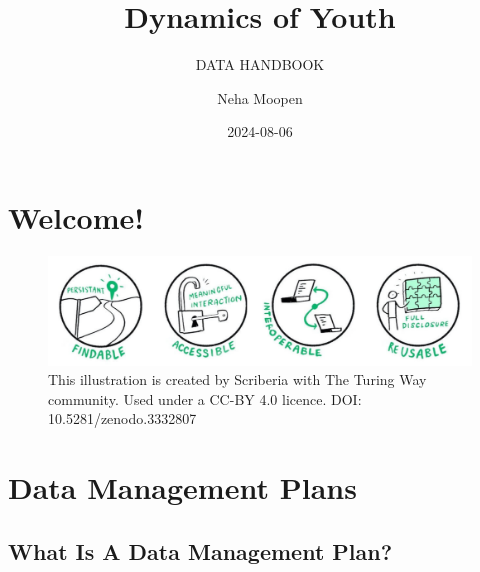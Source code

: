\documentclass[
  letterpaper,
  DIV=11,
  numbers=noendperiod]{scrreprt}
\title{Dynamics of Youth}
\subtitle{DATA HANDBOOK}
\author{Neha Moopen}
\date{2024-08-06}
\renewcommand*\contentsname{Table of contents}
\newcommand\contentsname{Table of contents}
\begin{document}
\maketitle
\ifdefined\Shaded\renewenvironment{Shaded}{\begin{tcolorbox}[sharp corners, borderline west={3pt}{0pt}{shadecolor}, boxrule=0pt, breakable, enhanced, frame hidden, interior hidden]}{\end{tcolorbox}}\fi

\renewcommand*\contentsname{Table of contents}
{
\hypersetup{linkcolor=}
\setcounter{tocdepth}{2}
\tableofcontents
}

\hypertarget{welcome}{%
\chapter*{Welcome!}\label{welcome}}


\begin{figure}

{\centering \includegraphics{images/fair-1x4.png}

}

\caption{This illustration is created by Scriberia with The Turing Way
community. Used under a CC-BY 4.0 licence. DOI: 10.5281/zenodo.3332807}

\end{figure}


\hypertarget{data-management-plans}{%
\chapter*{Data Management Plans}\label{data-management-plans}}


\hypertarget{what-is-a-data-management-plan}{%
\section*{What Is A Data Management
Plan?}\label{what-is-a-data-management-plan}}
\end{document}
